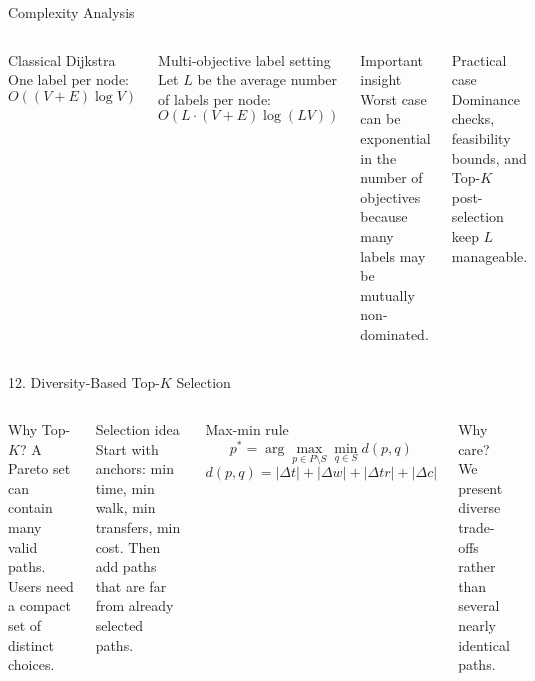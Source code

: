 \documentclass[aspectratio=169]{beamer}
\begin{document}
\begin{frame}{Complexity Analysis}
    \begin{columns}[T]
        \begin{block}{Classical Dijkstra}
            One label per node:
            \[
                O((V+E)\log V)
            \]
        \end{block}

        \begin{block}{Multi-objective label setting}
            Let \(L\) be the average number of labels per node:
            \[
                O\!\left(L\cdot(V+E)\log(LV)\right)
            \]
        \end{block}

        \begin{alertblock}{Important insight}
            Worst case can be exponential in the number of objectives because many labels may be mutually non-dominated.
        \end{alertblock}

        \begin{block}{Practical case}
            Dominance checks, feasibility bounds, and Top-\(K\) post-selection keep \(L\) manageable.
        \end{block}
    \end{columns}
\end{frame}

\begin{frame}{12. Diversity-Based Top-\(K\) Selection}
    \begin{columns}[T]
        \begin{block}{Why Top-\(K\)?}
            A Pareto set can contain many valid paths. Users need a compact set of distinct choices.
        \end{block}

        \begin{block}{Selection idea}
            Start with anchors: min time, min walk, min transfers, min cost.
            Then add paths that are far from already selected paths.
        \end{block}

        \begin{block}{Max-min rule}
            \[
                p^* = \arg\max_{p \in P\setminus S}
                \min_{q \in S} d(p,q)
            \]
            \[
                d(p,q)=|\Delta t|+|\Delta w|+|\Delta tr|+|\Delta c|
            \]
        \end{block}

        \begin{alertblock}{Why care?}
            We present diverse trade-offs rather than several nearly identical paths.
        \end{alertblock}
    \end{columns}
\end{frame}
\end{document}
